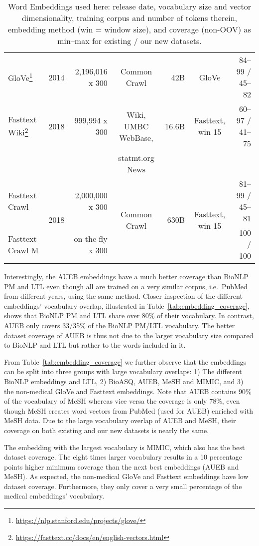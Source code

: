 \documentclass[letterpaper]{article} %
\begin{document}
\begin{table}[h]
\begin{tabular}{l c r c r c r}
         \midrule
         GloVe\footnote{\url{https://nlp.stanford.edu/projects/glove/}} & 2014 & 2,196,016 x 300 & Common Crawl & 42B & GloVe & 84--99 / 45--82\\
         Fasttext Wiki\footnote{\url{https://fasttext.cc/docs/en/english-vectors.html}} & 2018 & 999,994 x 300 & Wiki, UMBC WebBase, & 16.6B & Fasttext, win 15 & 60--97 / 41--75\\
         & & & statmt.org News \\
         Fasttext Crawl& \multirow{2}{*}{2018} & 2,000,000 x 300 & \multirow{2}{*}{Common Crawl} & \multirow{2}{*}{630B}& \multirow{2}{*}{Fasttext, win 15} & 81--99 / 45--81\\
         Fasttext Crawl M &  & on-the-fly x 300 & & & & 100 / 100\\
         \bottomrule
    \end{tabular}
    \caption{Word Embeddings used here: release date, vocabulary size and vector dimensionality, training corpus and number of tokens therein, embedding method (win = window size), and coverage (non-OOV) as min--max for existing / our new datasets.}
    \label{tab:embeddings}
\end{table}


Interestingly, the AUEB embeddings have a much better coverage than BioNLP PM and LTL even though all are trained on a very similar corpus, i.e.~PubMed from different years, using the same method.
Closer inspection of the different embeddings' vocabulary overlap, illustrated in  Table~\ref{tab:embedding_coverage}, shows that BioNLP PM and LTL share over 80\% of their vocabulary. In contrast, AUEB only covers 33/35\% of the BioNLP PM/LTL vocabulary. The better dataset coverage of AUEB is thus not due to the larger vocabulary size compared to BioNLP and LTL but rather to the words included in it.

From Table~\ref{tab:embedding_coverage} we further observe that the embeddings can be split into three groups with large vocabulary overlaps:
1) The different BioNLP embeddings and LTL, 2) BioASQ, AUEB, MeSH and MIMIC, and 3) the non-medical GloVe and Fasttext embeddings.
Note that AUEB contains 90\% of the vocabulary of MeSH whereas vice versa the coverage is only 78\%, even though MeSH creates word vectors from PubMed (used for AUEB) enriched with MeSH data. Due to the large vocabulary overlap of  AUEB and MeSH, their coverage on both existing and our new datasets is nearly the same.

The embedding with the largest vocabulary is MIMIC, which also has the best dataset coverage. The eight times larger vocabulary results in a 10 percentage points higher minimum coverage than the next best embeddings (AUEB and MeSH).
As expected, the non-medical GloVe and Fasttext embeddings have low dataset coverage.
Furthermore, they only cover a very small percentage of the medical embeddings' vocabulary.
\end{document}
